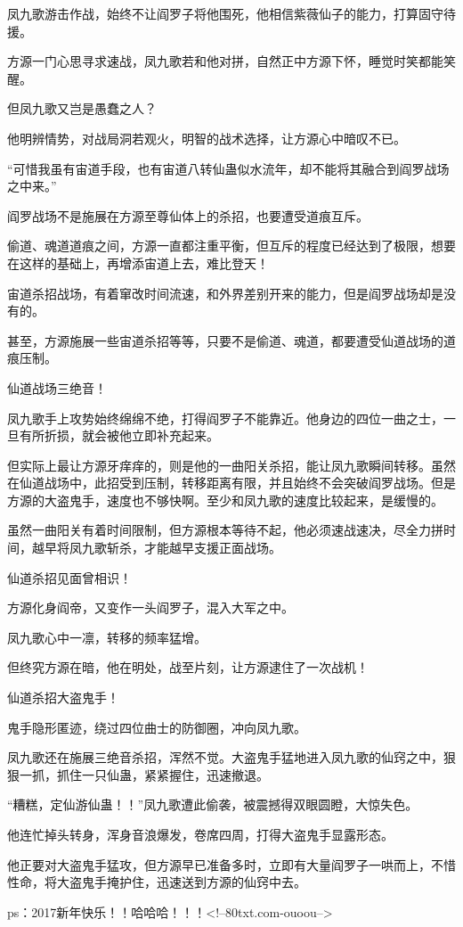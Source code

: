 \begin{this_body}
凤九歌游击作战，始终不让阎罗子将他围死，他相信紫薇仙子的能力，打算固守待援。

方源一门心思寻求速战，凤九歌若和他对拼，自然正中方源下怀，睡觉时笑都能笑醒。

但凤九歌又岂是愚蠢之人？

他明辨情势，对战局洞若观火，明智的战术选择，让方源心中暗叹不已。

“可惜我虽有宙道手段，也有宙道八转仙蛊似水流年，却不能将其融合到阎罗战场之中来。”

阎罗战场不是施展在方源至尊仙体上的杀招，也要遭受道痕互斥。

偷道、魂道道痕之间，方源一直都注重平衡，但互斥的程度已经达到了极限，想要在这样的基础上，再增添宙道上去，难比登天！

宙道杀招战场，有着窜改时间流速，和外界差别开来的能力，但是阎罗战场却是没有的。

甚至，方源施展一些宙道杀招等等，只要不是偷道、魂道，都要遭受仙道战场的道痕压制。

仙道战场三绝音！

凤九歌手上攻势始终绵绵不绝，打得阎罗子不能靠近。他身边的四位一曲之士，一旦有所折损，就会被他立即补充起来。

但实际上最让方源牙痒痒的，则是他的一曲阳关杀招，能让凤九歌瞬间转移。虽然在仙道战场中，此招受到压制，转移距离有限，并且始终不会突破阎罗战场。但是方源的大盗鬼手，速度也不够快啊。至少和凤九歌的速度比较起来，是缓慢的。

虽然一曲阳关有着时间限制，但方源根本等待不起，他必须速战速决，尽全力拼时间，越早将凤九歌斩杀，才能越早支援正面战场。

仙道杀招见面曾相识！

方源化身阎帝，又变作一头阎罗子，混入大军之中。

凤九歌心中一凛，转移的频率猛增。

但终究方源在暗，他在明处，战至片刻，让方源逮住了一次战机！

仙道杀招大盗鬼手！

鬼手隐形匿迹，绕过四位曲士的防御圈，冲向凤九歌。

凤九歌还在施展三绝音杀招，浑然不觉。大盗鬼手猛地进入凤九歌的仙窍之中，狠狠一抓，抓住一只仙蛊，紧紧握住，迅速撤退。

“糟糕，定仙游仙蛊！！”凤九歌遭此偷袭，被震撼得双眼圆瞪，大惊失色。

他连忙掉头转身，浑身音浪爆发，卷席四周，打得大盗鬼手显露形态。

他正要对大盗鬼手猛攻，但方源早已准备多时，立即有大量阎罗子一哄而上，不惜性命，将大盗鬼手掩护住，迅速送到方源的仙窍中去。

ps：2017新年快乐！！哈哈哈！！！<!--80txt.com-ouoou-->

\end{this_body}

